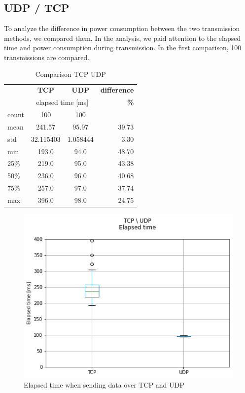 \subsection{UDP / TCP}
To analyze the difference in power consumption between the two transmission methods,
we compared them. In the analysis, we paid attention to the elapsed time and power consumption during transmission. In the first comparison, 100 transmissions are compared.
\linebreak
\begin{table}[H]
    \begin{center}
    \caption{Comparison TCP UDP}
    \label{tab:table3}
    \renewcommand{\arraystretch}{1.8}
    \begin{tabular}{l|c|c|r}
    & \textbf{TCP} & \textbf{UDP} & \textbf{difference} \\
    & \multicolumn{2}{c|}{elapsed time [ms]} & \textbf{\%}\\
    \hline
    count & 100 & 100 & \\
    mean  & 241.57 & 95.97 & 39.73 \\
    std   & 32.115403 & 1.058444 & 3.30 \\
    min   & 193.0 & 94.0 & 48.70 \\
    25\%  & 219.0 & 95.0 & 43.38 \\
    50\%  & 236.0 & 96.0 & 40.68 \\
    75\%  & 257.0 & 97.0 & 37.74 \\
    max   & 396.0 & 98.0 & 24.75 \\
    \end{tabular}
    \end{center}
\end{table}
\begin{figure}[H]
    \centering
    \includegraphics[width = 0.9 \linewidth]{fig/udp_tcp/udp_tcp_boxplot_time.png}
    \caption{Elapsed time when sending data over TCP and UDP}
    \label{fig:udp_tcp_boxplot_time}
    \end{figure}
